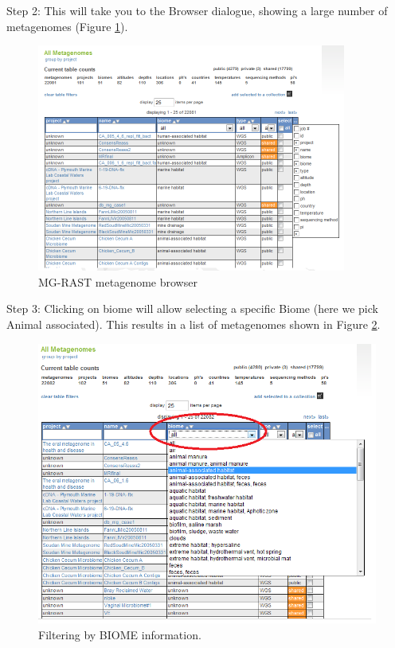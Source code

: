 \documentclass[12pt,fullpage]{report}
\begin{document}
Step 2: This will take you to the Browser dialogue, showing a large number of metagenomes (Figure \ref{fig:browse-window}).

\begin{figure}
\begin{center}
\includegraphics[width=4in]{Images/collections-browse-window.png}
\end{center}
\caption{
MG-RAST metagenome browser}
\label{fig:browse-window}
\end{figure}

Step 3: Clicking on biome will allow selecting a specific Biome (here we pick Animal associated).
This results in a list of metagenomes shown in 
Figure \ref{fig:collections-filter-by-biome}.


\begin{figure}
\begin{center}
\includegraphics[width=6in]{Images/collections-filter-by-biome.png}
\end{center}
\caption{
Filtering by BIOME information. }
\label{fig:collections-filter-by-biome}
\end{figure}
\end{document}

